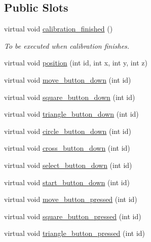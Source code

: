 \subsection*{Public Slots}
\begin{DoxyCompactItemize}
\item 
\hypertarget{class_game_state_af9be4d918d452c0be723fb96e9c2e699}{virtual void \hyperlink{class_game_state_af9be4d918d452c0be723fb96e9c2e699}{calibration\-\_\-finished} ()}\label{class_game_state_af9be4d918d452c0be723fb96e9c2e699}

\begin{DoxyCompactList}\small\item\em To be executed when calibration finishes. \end{DoxyCompactList}\item 
virtual void \hyperlink{class_game_state_ac8f14bed66fc7a5931663ea934f75d42}{position} (int id, int x, int y, int z)
\item 
virtual void \hyperlink{class_game_state_adb2e4994625b5d7bc6994ff36351f92a}{move\-\_\-button\-\_\-down} (int id)
\item 
virtual void \hyperlink{class_game_state_a4c2eb5fabf420d0970b754867758470b}{square\-\_\-button\-\_\-down} (int id)
\item 
virtual void \hyperlink{class_game_state_a6bff3607f73955e051aaa830353ec8e4}{triangle\-\_\-button\-\_\-down} (int id)
\item 
virtual void \hyperlink{class_game_state_a2b127b1e5a6e9c11808bfda7b124b322}{circle\-\_\-button\-\_\-down} (int id)
\item 
virtual void \hyperlink{class_game_state_a7fadb26ce5c2fce84f9a1ef7cb9ea924}{cross\-\_\-button\-\_\-down} (int id)
\item 
virtual void \hyperlink{class_game_state_aca8648bffd21910d90cdb22238cf451b}{select\-\_\-button\-\_\-down} (int id)
\item 
virtual void \hyperlink{class_game_state_a5cbb3463c0e886d0a88ec6d26f61fb85}{start\-\_\-button\-\_\-down} (int id)
\item 
virtual void \hyperlink{class_game_state_a9aae252ce4557380f6a36fc07db82865}{move\-\_\-button\-\_\-pressed} (int id)
\item 
virtual void \hyperlink{class_game_state_ac563b15bc6d5111df054ceb1afbeb353}{square\-\_\-button\-\_\-pressed} (int id)
\item 
virtual void \hyperlink{class_game_state_af59c3923c4cb942c412d3c95a37182f4}{triangle\-\_\-button\-\_\-pressed} (int id)
\item 

\end{DoxyCompactItemize}
